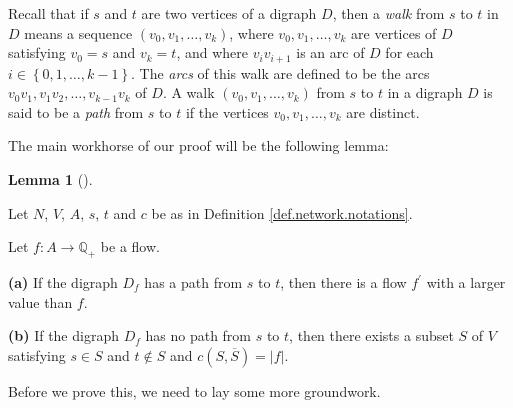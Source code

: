\documentclass[numbers=enddot,12pt,final,onecolumn,notitlepage]{scrartcl}%
\theoremstyle{definition}
\newtheorem{lem}[theo]{Lemma}
\newenvironment{lemma}[1][]
{\begin{lem}[#1]\begin{leftbar}}
{\end{leftbar}\end{lem}}
\begin{document}
Recall that if $s$ and $t$ are two vertices of a digraph $D$, then a
\textit{walk} from $s$ to $t$ in $D$ means a sequence $\left(  v_{0}%
,v_{1},\ldots,v_{k}\right)  $, where $v_{0},v_{1},\ldots,v_{k}$ are vertices
of $D$ satisfying $v_{0}=s$ and $v_{k}=t$, and where $v_{i}v_{i+1}$ is an arc
of $D$ for each $i\in\left\{  0,1,\ldots,k-1\right\}  $. The \textit{arcs} of
this walk are defined to be the arcs $v_{0}v_{1},v_{1}v_{2},\ldots
,v_{k-1}v_{k}$ of $D$. A walk $\left(  v_{0},v_{1},\ldots,v_{k}\right)  $ from
$s$ to $t$ in a digraph $D$ is said to be a \textit{path} from $s$ to $t$ if
the vertices $v_{0},v_{1},\ldots,v_{k}$ are distinct.

The main workhorse of our proof will be the following lemma:

\begin{lemma}
\label{lem.4}Let $N$, $V$, $A$, $s$, $t$ and $c$ be as in Definition
\ref{def.network.notations}.

Let $f:A\rightarrow\mathbb{Q}_{+}$ be a flow.

\textbf{(a)} If the digraph $D_{f}$ has a path from $s$ to $t$, then there is
a flow $f^{\prime}$ with a larger value than $f$.

\textbf{(b)} If the digraph $D_{f}$ has no path from $s$ to $t$, then there
exists a subset $S$ of $V$ satisfying $s\in S$ and $t\notin S$ and $c\left(
S,\overline{S}\right)  =\left\vert f\right\vert $.
\end{lemma}

Before we prove this, we need to lay some more groundwork.
\end{document}
